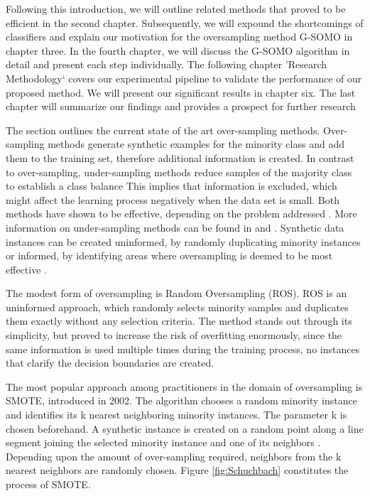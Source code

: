 \documentclass[parskip=full]{scrartcl}
\begin{document}
Following this introduction, we will outline related methods that proved to be efficient in the second chapter. Subsequently, we will expound the shortcomings of classifiers and explain our motivation for the oversampling method G-SOMO in chapter three. In the fourth chapter, we will discuss the G-SOMO algorithm in detail and present each step individually. The following chapter 'Research Methodology‘ covers our experimental pipeline to validate the performance of our proposed method. We will present our significant results in chapter six. The last chapter will summarize our findings and provides a prospect for further research



The section outlines the current state of the art over-sampling methods. Over-sampling methods generate synthetic examples for the minority class and add them to the training set, therefore additional information is created. In contrast to over-sampling, under-sampling methods reduce samples of the majority class to establish a class balance This implies that information is excluded, which might affect the learning process negatively when the data set is small. Both methods have shown to be effective, depending on the problem addressed \cite{Chawla2002}. More information on under-sampling methods can be found in \cite{Ganganwar2012} and \cite{Yen2006}. Synthetic data instances can be created uninformed, by randomly duplicating minority instances or informed, by identifying areas where oversampling is deemed to be most effective  \cite{Last2017}. 

The modest form of oversampling is Random Oversampling (ROS). ROS is an uninformed approach, which randomly selects minority samples and duplicates them exactly without any selection criteria. The method stands out through its simplicity, but proved to increase the risk of overfitting enormously, since the same information is used multiple times during the training process, no instances that clarify the decision boundaries are created. 

The most popular approach among practitioners in the domain of oversampling is SMOTE, introduced in 2002. The algorithm chooses a random minority instance and identifies its k nearest neighboring minority instances. The parameter k is chosen beforehand. A synthetic instance is created on a random point along a line segment joining the selected minority instance and one of its neighbors \cite{Chawla2002}.  Depending upon the amount of over-sampling required, neighbors from the k nearest neighbors are randomly chosen. Figure \ref{fig:Schuchbach} constitutes the process of SMOTE.
\end{document}
